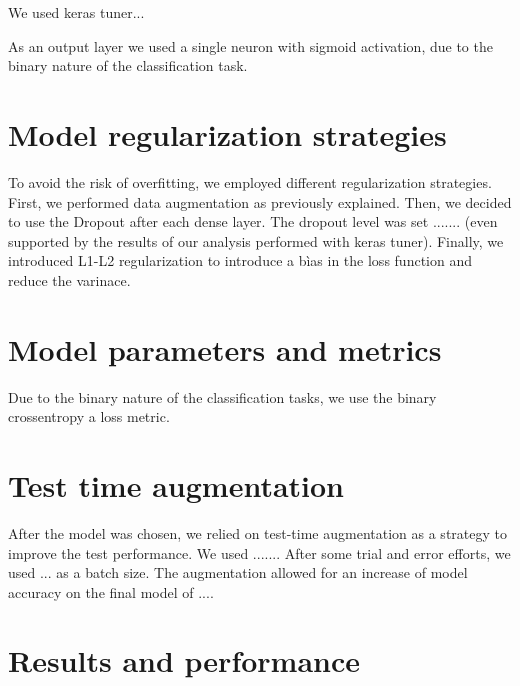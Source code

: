 \documentclass[conference,compsoc,11pt]{IEEEtran} %
\begin{document}
We used keras tuner...

As an output layer we used a single neuron with sigmoid activation, due to the binary nature of the classification task.


\section {Model regularization strategies}
\vspace{-0.3cm}

To avoid the risk of overfitting, we employed different regularization strategies. \\ First, we performed data augmentation as previously explained. Then, we decided to use the Dropout after each dense layer. The dropout level was set ....... (even supported by the results of our analysis performed with keras tuner). Finally, we introduced L1-L2 regularization to introduce a bìas in the loss function and reduce the varinace. 

\section {Model parameters and metrics}
\vspace{-0.3cm}

Due to the binary nature of the classification tasks, we use the binary crossentropy a loss metric. 

\section {Test time augmentation}
\vspace{-0.3cm}

After the model was chosen, we relied on test-time augmentation as a strategy to improve the test performance. We used ....... After some trial and error efforts, we used ... as a batch size. The augmentation allowed for an increase of model accuracy on the final model of ....  


\section {Results and performance} 
\vspace{-0.3cm}
\end{document}

